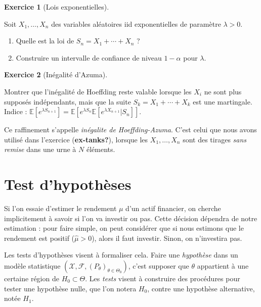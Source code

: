 \documentclass[
  10,
  letterpaper,
  DIV=11,
  numbers=noendperiod]{scrreport}
\providecommand{\tightlist}{%
  \setlength{\itemsep}{0pt}\setlength{\parskip}{0pt}}\usepackage{longtable,booktabs,array}
\theoremstyle{plain}
\theoremstyle{definition}
\newtheorem{exercise}{Exercice}[chapter]
\theoremstyle{plain}
\theoremstyle{definition}
\theoremstyle{definition}
\theoremstyle{plain}
\theoremstyle{remark}
\begin{document}
\begin{exercise}[Lois
exponentielles]\protect\hypertarget{exr-expo}{}\label{exr-expo}

Soit \(X_1, \dotsc, X_n\) des variables aléatoires iid exponentielles de
paramètre \(\lambda>0\).

\begin{enumerate}
\def\labelenumi{\arabic{enumi}.}
\tightlist
\item
  Quelle est la loi de \(S_n = X_1 + \dotsb + X_n\) ?
\item
  Construire un intervalle de confiance de niveau \(1-\alpha\) pour
  \(\lambda\).
\end{enumerate}

\end{exercise}

\begin{exercise}[Inégalité
d'Azuma]\protect\hypertarget{exr-azuma}{}\label{exr-azuma}

Montrer que l'inégalité de Hoeffding reste valable lorsque les \(X_i\)
ne sont plus supposés indépendants, mais que la suite
\(S_k = X_1 + \dotsb + X_k\) est une martingale. Indice :
\(\mathbb{E}[e^{\lambda S_{n+1}}] = \mathbb{E}[e^{\lambda S_n}\mathbb{E}[e^{\lambda X_{n+1}}|S_n]]\).

Ce raffinement s'appelle \emph{inégalite de Hoeffding-Azuma}. C'est
celui que nous avons utilisé dans l'exercice (\textbf{ex-tanks?}),
lorsque les \(X_1, \dotsc, X_n\) sont des tirages \emph{sans remise}
dans une urne à \(N\) éléments.

\end{exercise}


\hypertarget{test-dhypothuxe8ses}{%
\chapter{Test d'hypothèses}\label{test-dhypothuxe8ses}}

Si l'on essaie d'estimer le rendement \(\mu\) d'un actif financier, on
cherche implicitement à savoir si l'on va investir ou pas. Cette
décision dépendra de notre estimation : pour faire simple, on peut
considérer que si nous estimons que le rendement est positif
(\(\hat{\mu}>0\)), alors il faut investir. Sinon, on n'investira pas.

Les tests d'hypothèses visent à formaliser cela. Faire une
\emph{hypothèse} dans un modèle statistique
\((\mathcal{X}, \mathscr{F}, (P_\theta)_{\theta \in \Theta_0})\), c'est
supposer que \(\theta\) appartient à une certaine région de
\(H_0 \subset \Theta\). Les \emph{tests} visent à construire des
procédures pour tester une hypothèse nulle, que l'on notera \(H_0\),
contre une hypothèse alternative, notée \(H_1\).
\end{document}
